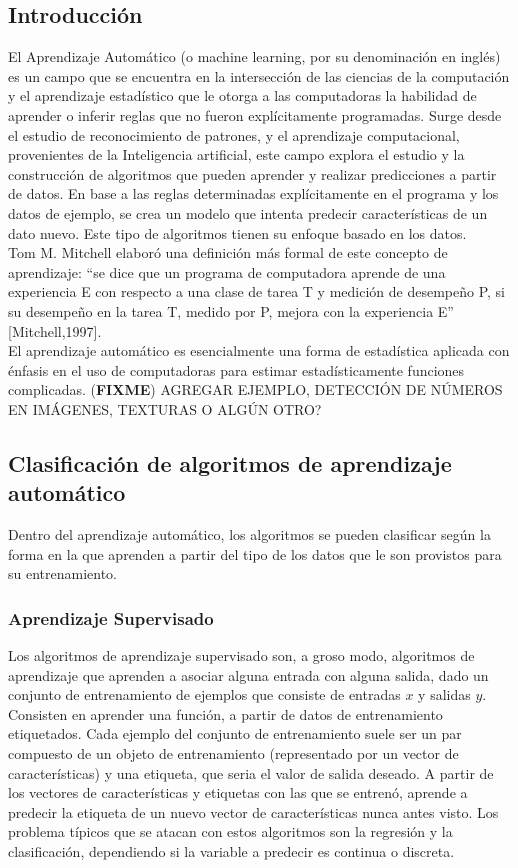 \documentclass[a4paper,11pt,spanish]{book}
\newcommand*{\FIXME}[1]{{(\textbf{FIXME}) {#1}}}
\begin{document}
    \subsection{Introducción}
      El Aprendizaje Automático (o machine learning, por su denominación en
      inglés) es un campo que se encuentra en la intersección de las ciencias de la computación y el aprendizaje estadístico que le otorga a las computadoras la habilidad de aprender o inferir reglas que no fueron explícitamente programadas.
      Surge desde el estudio de reconocimiento de patrones, y el aprendizaje computacional, provenientes de la Inteligencia artificial, este campo explora el estudio y la construcción de algoritmos
      que pueden aprender y realizar predicciones a partir de datos. En base a las reglas determinadas explícitamente en el programa y los datos de ejemplo, se crea un modelo que intenta predecir
      características de un dato nuevo. Este tipo de algoritmos tienen su enfoque basado en los datos.\\
      Tom M. Mitchell elaboró una definición más formal de este concepto de aprendizaje: “se dice que un programa de computadora aprende de una experiencia E con respecto a una clase
      de tarea T y medición de desempeño P, si su desempeño en la tarea T, medido por P, mejora con la experiencia E” [Mitchell,1997].\\
      El aprendizaje automático es esencialmente una forma de estadística aplicada con énfasis en el uso de computadoras para estimar estadísticamente funciones complicadas.
      \FIXME{AGREGAR EJEMPLO, DETECCIÓN DE NÚMEROS EN IMÁGENES, TEXTURAS O ALGÚN OTRO?}

    \subsection{Clasificación de algoritmos de aprendizaje automático}
      Dentro del aprendizaje automático, los algoritmos se pueden clasificar
      según la forma en la que aprenden a partir del tipo de los datos que le son provistos para su entrenamiento.

      \subsubsection{Aprendizaje Supervisado}
	Los algoritmos de aprendizaje supervisado son, a groso modo, algoritmos de aprendizaje que aprenden a asociar alguna entrada con alguna salida,
	dado un conjunto de entrenamiento de ejemplos que consiste de entradas $x$ y salidas $y$.
	Consisten en aprender una función, a partir de datos de entrenamiento etiquetados. Cada ejemplo del conjunto de entrenamiento suele ser un par
	compuesto de un objeto de entrenamiento (representado por un vector de características) y una etiqueta, que seria el valor de salida deseado.
	A partir de los vectores de características y etiquetas con las que se entrenó, aprende a predecir la etiqueta de un nuevo vector de características nunca antes visto.
	Los problema típicos que se atacan con estos algoritmos son la regresión y la clasificación, dependiendo si la variable a predecir es continua o discreta.
\end{document}
